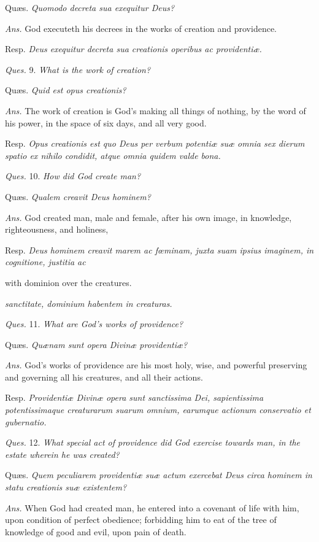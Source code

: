 Quæs. \emph{Quomodo decreta sua exequitur Deus?}

\emph{Ans.} God executeth his decrees in the works of creation and providence.

Resp. \emph{Deus exequitur decreta sua creationis operibus ac providentiæ.}

\emph{Ques.} 9. \emph{What is the work of creation?}

Quæs. \emph{Quid est opus creationis?}

\emph{Ans.} The work of creation is God's making all things of nothing, by the word of his power, in the space of six days, and all very good.

Resp. \emph{Opus creationis est quo Deus per verbum potentiæ suæ omnia sex dierum spatio ex nihilo condidit, atque omnia quidem valde bona.}

\emph{Ques.} 10. \emph{How did God create man?}

Quæs. \emph{Qualem creavit Deus hominem?}

\emph{Ans.} God created man, male and female, after his own image, in knowledge, righteousness, and holiness,

Resp. \emph{Deus hominem creavit marem ac fœminam, juxta suam ipsius imaginem, in cognitione, justitia ac }

with dominion over the creatures.

\emph{sanctitate, dominium habentem in creaturas.}

\emph{Ques.} 11. \emph{What are God's works of providence?}

Quæs. \emph{Quænam sunt opera Divinæ providentiæ?}

\emph{Ans.} God's works of providence are his most holy, wise, and powerful preserving and governing all his creatures, and all their actions.

Resp. \emph{Providentiæ Divinæ opera sunt sanctissima Dei, sapientissima potentissimaque creaturarum suarum omnium, earumque actionum conservatio et gubernatio.}

\emph{Ques.} 12. \emph{What special act of providence did God exercise towards man, in the estate wherein he was created?}

Quæs. \emph{Quem peculiarem providentiæ suæ actum exercebat Deus circa hominem in statu creationis suæ existentem?}

\emph{Ans.} When God had created man, he entered into a covenant of life with him, upon condition of perfect obedience; forbidding him to eat of the tree of knowledge of good and evil, upon pain of death.

